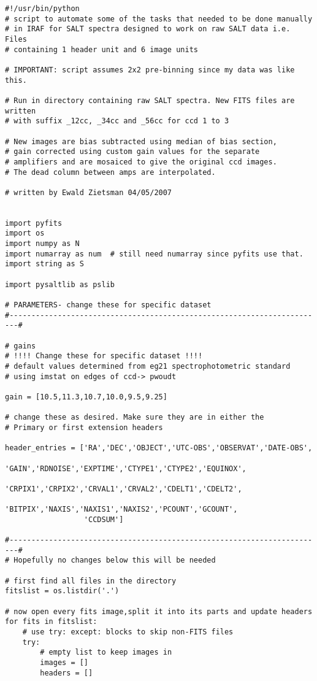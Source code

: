 \begin{footnotesize} 
\begin{verbatim}
#!/usr/bin/python
# script to automate some of the tasks that needed to be done manually 
# in IRAF for SALT spectra designed to work on raw SALT data i.e. Files 
# containing 1 header unit and 6 image units

# IMPORTANT: script assumes 2x2 pre-binning since my data was like this. 

# Run in directory containing raw SALT spectra. New FITS files are written 
# with suffix _12cc, _34cc and _56cc for ccd 1 to 3

# New images are bias subtracted using median of bias section, 
# gain corrected using custom gain values for the separate 
# amplifiers and are mosaiced to give the original ccd images. 
# The dead column between amps are interpolated.

# written by Ewald Zietsman 04/05/2007 


import pyfits
import os
import numpy as N
import numarray as num  # still need numarray since pyfits use that. 
import string as S

import pysaltlib as pslib

# PARAMETERS- change these for specific dataset
#------------------------------------------------------------------------#

# gains
# !!!! Change these for specific dataset !!!!
# default values determined from eg21 spectrophotometric standard 
# using imstat on edges of ccd-> pwoudt

gain = [10.5,11.3,10.7,10.0,9.5,9.25]

# change these as desired. Make sure they are in either the 
# Primary or first extension headers

header_entries = ['RA','DEC','OBJECT','UTC-OBS','OBSERVAT','DATE-OBS',
                  'GAIN','RDNOISE','EXPTIME','CTYPE1','CTYPE2','EQUINOX',
                  'CRPIX1','CRPIX2','CRVAL1','CRVAL2','CDELT1','CDELT2',
                  'BITPIX','NAXIS','NAXIS1','NAXIS2','PCOUNT','GCOUNT',
                  'CCDSUM']

#------------------------------------------------------------------------#
# Hopefully no changes below this will be needed

# first find all files in the directory
fitslist = os.listdir('.')

# now open every fits image,split it into its parts and update headers
for fits in fitslist:
    # use try: except: blocks to skip non-FITS files
    try:
        # empty list to keep images in
        images = []
        headers = []


\end{verbatim}
\end{footnotesize}

